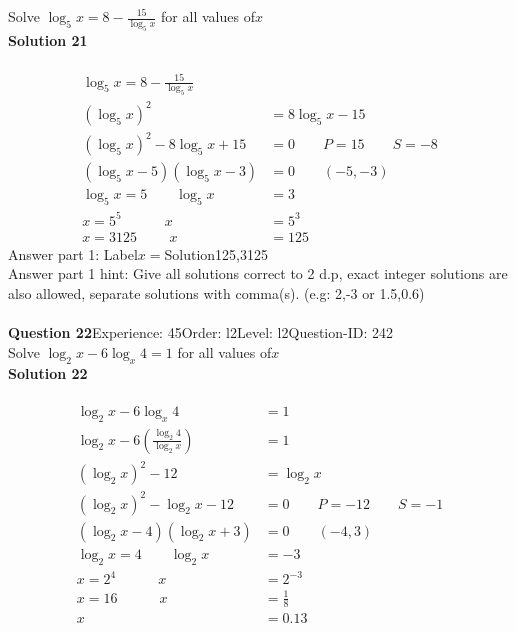 \documentclass{article}
\begin{document}
Solve $\log_{5}x=8-\displaystyle\frac{15}{\log_5{x}}$ for all values of$x$\\[4pt]
\noindent\textbf{Solution 21}\\[2pt]
\\[-35pt]\begin{align*}
\log_{5}x=8-\displaystyle\frac{15}{\log_5{x}}\\[2pt]
(\log_{5}x)^2&=8\log_{5}x-15\\[2pt]
(\log_{5}x)^2-8\log_{5}x+15&=0\qquad P=15 \qquad S=-8\\[2pt]
(\log_{5}x-5)(\log_{5}x-3)&=0\qquad (-5,-3)\\[2pt]
\log_{5}x=5\qquad\log_{5}x&=3\\[2pt]
x=5^5\hspace{37pt} x&=5^3\\[2pt]
x=3125\hspace{28pt}x&=125
\end{align*}
Answer part 1: \hspace{10pt}Label\hspace{10pt}$x=$\hspace{10pt}Solution\hspace{10pt}125,3125\\
Answer part 1 hint: \hspace{15pt} Give all solutions correct to 2 d.p, exact integer solutions are also allowed, separate solutions with comma(s). (e.g: 2,-3 or 1.5,0.6)\\
\\[4pt]
\noindent\textbf{Question 22}\hspace{20pt}Experience: 45\hspace{20pt}Order: l2\hspace{20pt}Level: l2\hspace{20pt}Question-ID: 242\\[2pt]
Solve $\log_{2}x-6\log_{x}4=1$ for all values of$x$\\[4pt]
\noindent\textbf{Solution 22}\\[2pt]
\\[-35pt]\begin{align*}
\log_{2}x-6\log_{x}4&=1\\[2pt]
\log_{2}x-6\left(\displaystyle\frac{\log_{2}4}{\log_{2}x}\right)&=1\\[2pt]
(\log_{2}x)^2-12&=\log_{2}x\\[2pt]
(\log_{2}x)^2-\log_{2}x-12&=0\qquad P=-12 \qquad S=-1\\[2pt]
(\log_{2}x-4)(\log_{2}x+3)&=0\qquad (-4,3)\\[2pt]
\log_{2}x=4 \qquad \log_{2}x&=-3\\[2pt]
x=2^4 \hspace{36pt} x&=2^{-3}\\[2pt]
x=16 \hspace{36pt} x&=\displaystyle\frac{1}{8}\\[2pt]
x&=0.13
\end{align*}
\end{document}
